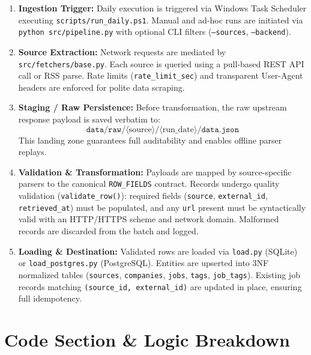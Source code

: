\documentclass[10pt,letterpaper]{article}
\begin{document}
\begin{enumerate}[leftmargin=2em]
    \item \textbf{Ingestion Trigger:}
    Daily execution is triggered via Windows Task Scheduler executing \texttt{scripts/run\_daily.ps1}. Manual and ad-hoc runs are initiated via \texttt{python src/pipeline.py} with optional CLI filters (\texttt{--sources}, \texttt{--backend}).
    
    \item \textbf{Source Extraction:}
    Network requests are mediated by \texttt{src/fetchers/base.py}. Each source is queried using a pull-based REST API call or RSS parse. Rate limits (\texttt{rate\_limit\_sec}) and transparent User-Agent headers are enforced for polite data scraping.
    
    \item \textbf{Staging / Raw Persistence:}
    Before transformation, the raw upstream response payload is saved verbatim to:
    \[
        \texttt{data/raw/}\langle\text{source}\rangle/\langle\text{run\_date}\rangle/\texttt{data.json}
    \]
    This landing zone guarantees full auditability and enables offline parser replays.
    
    \item \textbf{Validation \& Transformation:}
    Payloads are mapped by source-specific parsers to the canonical \texttt{ROW\_FIELDS} contract. Records undergo quality validation (\texttt{validate\_row()}): required fields (\texttt{source}, \texttt{external\_id}, \texttt{retrieved\_at}) must be populated, and any \texttt{url} present must be syntactically valid with an HTTP/HTTPS scheme and network domain. Malformed records are discarded from the batch and logged.
    
    \item \textbf{Loading \& Destination:}
    Validated rows are loaded via \texttt{load.py} (SQLite) or \texttt{load\_postgres.py} (PostgreSQL). Entities are upserted into 3NF normalized tables (\texttt{sources}, \texttt{companies}, \texttt{jobs}, \texttt{tags}, \texttt{job\_tags}). Existing job records matching \texttt{(source\_id, external\_id)} are updated in place, ensuring full idempotency.
\end{enumerate}

\newpage
\section{Code Section \& Logic Breakdown}
\end{document}
